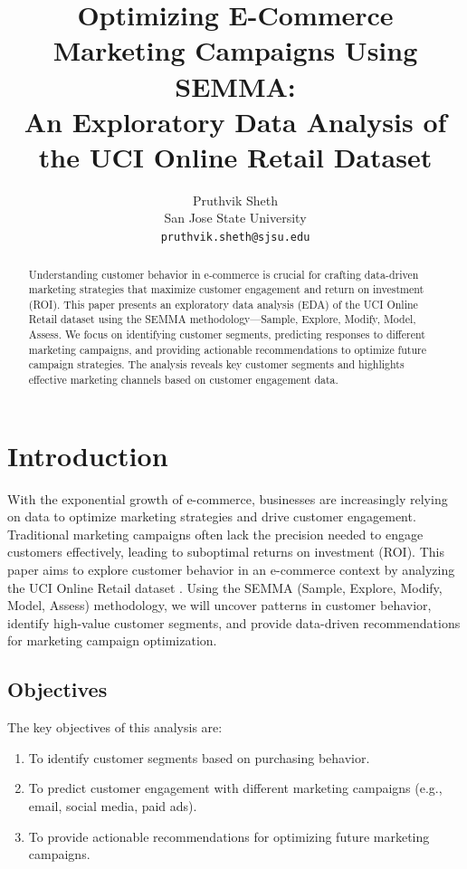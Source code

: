 \documentclass[12pt]{article}
\title{Optimizing E-Commerce Marketing Campaigns Using SEMMA: \\An Exploratory Data Analysis of the UCI Online Retail Dataset}
\author{Pruthvik Sheth\\
        San Jose State University\\
        \texttt{pruthvik.sheth@sjsu.edu}}
\date{}
\begin{document}
\maketitle

\begin{abstract}
Understanding customer behavior in e-commerce is crucial for crafting data-driven marketing strategies that maximize customer engagement and return on investment (ROI). This paper presents an exploratory data analysis (EDA) of the UCI Online Retail dataset using the SEMMA methodology—Sample, Explore, Modify, Model, Assess. We focus on identifying customer segments, predicting responses to different marketing campaigns, and providing actionable recommendations to optimize future campaign strategies. The analysis reveals key customer segments and highlights effective marketing channels based on customer engagement data.
\end{abstract}

\section{Introduction}
With the exponential growth of e-commerce, businesses are increasingly relying on data to optimize marketing strategies and drive customer engagement. Traditional marketing campaigns often lack the precision needed to engage customers effectively, leading to suboptimal returns on investment (ROI). This paper aims to explore customer behavior in an e-commerce context by analyzing the UCI Online Retail dataset \cite{uci_dataset}. Using the SEMMA (Sample, Explore, Modify, Model, Assess) methodology, we will uncover patterns in customer behavior, identify high-value customer segments, and provide data-driven recommendations for marketing campaign optimization.

\subsection{Objectives}
The key objectives of this analysis are:
\begin{enumerate}
    \item To identify customer segments based on purchasing behavior.
    \item To predict customer engagement with different marketing campaigns (e.g., email, social media, paid ads).
    \item To provide actionable recommendations for optimizing future marketing campaigns.
\end{enumerate}
\end{document}
